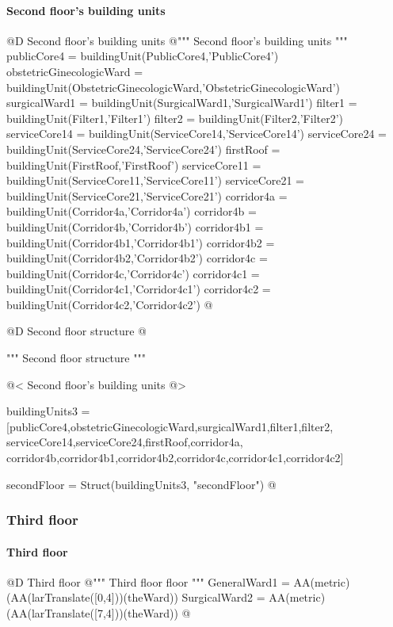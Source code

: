 \documentclass[11pt,oneside]{article}    %
\begin{document}
\paragraph{Second floor's building units}
@D Second floor's building units 
@{""" Second floor's building units """
publicCore4 = buildingUnit(PublicCore4,'PublicCore4')
obstetricGinecologicWard = buildingUnit(ObstetricGinecologicWard,'ObstetricGinecologicWard')
surgicalWard1 = buildingUnit(SurgicalWard1,'SurgicalWard1')
filter1 = buildingUnit(Filter1,'Filter1')
filter2 = buildingUnit(Filter2,'Filter2')
serviceCore14 = buildingUnit(ServiceCore14,'ServiceCore14')
serviceCore24 = buildingUnit(ServiceCore24,'ServiceCore24')
firstRoof = buildingUnit(FirstRoof,'FirstRoof')
serviceCore11 = buildingUnit(ServiceCore11,'ServiceCore11')
serviceCore21 = buildingUnit(ServiceCore21,'ServiceCore21')
corridor4a = buildingUnit(Corridor4a,'Corridor4a')
corridor4b = buildingUnit(Corridor4b,'Corridor4b')
corridor4b1 = buildingUnit(Corridor4b1,'Corridor4b1')
corridor4b2 = buildingUnit(Corridor4b2,'Corridor4b2')
corridor4c = buildingUnit(Corridor4c,'Corridor4c')
corridor4c1 = buildingUnit(Corridor4c1,'Corridor4c1')
corridor4c2 = buildingUnit(Corridor4c2,'Corridor4c2')
@}

@D Second floor structure
@{""" Second floor structure """

@< Second floor's building units @>

buildingUnits3 = [publicCore4,obstetricGinecologicWard,surgicalWard1,filter1,filter2,
serviceCore14,serviceCore24,firstRoof,corridor4a,
corridor4b,corridor4b1,corridor4b2,corridor4c,corridor4c1,corridor4c2]
    
secondFloor = Struct(buildingUnits3, "secondFloor")
@}



\subsubsection{Third floor}
\paragraph{Third floor}
@D Third floor
@{""" Third floor floor """
GeneralWard1 = AA(metric)(AA(larTranslate([0,4]))(theWard))
SurgicalWard2 = AA(metric)(AA(larTranslate([7,4]))(theWard))
@}
\end{document}
